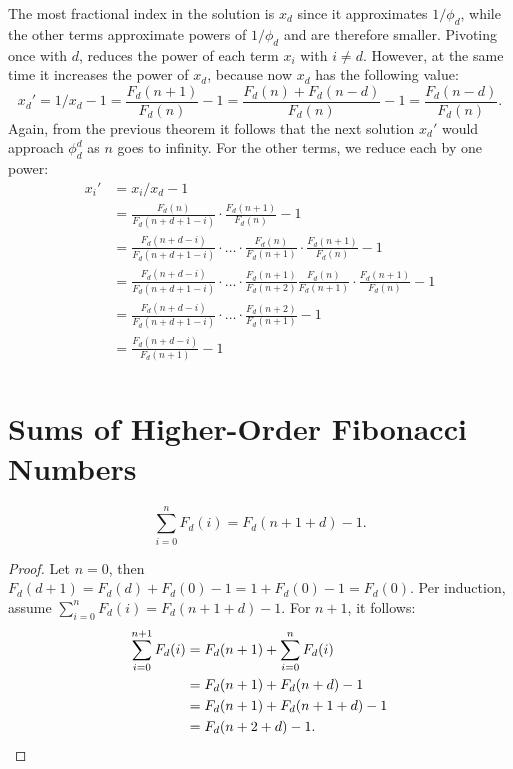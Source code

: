 \documentclass[english,version-2020-11]{uzl-thesis}
\begin{document}
The most fractional index in the solution is $x_d$ since it approximates $1/\phi_d$,
while the other terms approximate powers of $1/\phi_d$ and are therefore smaller.
Pivoting once with $d$, reduces the power of each term $x_i$ with $i \ne d$.
However, at the same time it increases the power of $x_d$, because now $x_d$ has the following value:
\[
  x_d' = 1/x_d - 1 = \frac{F_d(n+1)}{F_d(n)} - 1 = \frac{F_d(n) + F_d(n - d)}{F_d(n)} - 1 = \frac{F_d(n - d)}{F_d(n)}.
\]
Again, from the previous theorem it follows that the next solution $x_d'$ would approach $\phi_d^d$ as $n$ goes to infinity.
For the other terms, we reduce each by one power:
\begin{align*}
  x_i'
  & = x_i/x_d - 1 \\
  & = \frac{F_d(n)}{F_d(n + d + 1 - i)} \cdot \frac{F_d(n + 1)}{F_d(n)} - 1 \\
  & = \frac{F_d(n + d - i)}{F_d(n + d + 1 - i)} \cdot \dots \cdot \frac{F_d(n)}{F_d(n + 1)} \cdot \frac{F_d(n + 1)}{F_d(n)} - 1 \\
  & = \frac{F_d(n + d - i)}{F_d(n + d + 1 - i)} \cdot \dots \cdot \frac{F_d(n+1)}{F_d(n + 2)} \frac{F_d(n)}{F_d(n + 1)} \cdot \frac{F_d(n + 1)}{F_d(n)} - 1 \\
  & = \frac{F_d(n + d - i)}{F_d(n + d + 1 - i)} \cdot \dots \cdot \frac{F_d(n+2)}{F_d(n + 1)} - 1 \\
  & = \frac{F_d(n + d - i)}{F_d(n + 1)} - 1 \\
\end{align*}

\section{Sums of Higher-Order Fibonacci Numbers}

\begin{lemma}
  \[\sum_{i = 0}^n F_d(i) = F_d(n + 1 + d) - 1.\]
\end{lemma}

\begin{proof}
  Let $n = 0$, then $F_d(d + 1) = F_d(d) + F_d(0) - 1 = 1 + F_d(0) - 1 = F_d(0)$.
  Per induction, assume $\sum_{i=0}^n F_d(i) = F_d(n + 1 + d) - 1$. For $n + 1$, it follows:
  \begin{align*}
    \sum_{i = 0}^{n+1} F_d(i)
    & = F_d(n + 1) + \sum_{i = 0}^n F_d(i) \\
    & = F_d(n + 1) + F_d(n + d) - 1 \\
    & = F_d(n + 1) + F_d(n + 1 + d) - 1 \\
    & = F_d(n + 2 + d) - 1. \qedhere
  \end{align*}
\end{proof}
\end{document}
